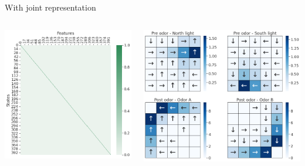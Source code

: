 \documentclass[bigger]{beamer}
\begin{document}
\begin{frame}[label={sec:org0d39be9}]{With joint representation}
\begin{columns}
\begin{column}{0.5\columnwidth}
\begin{center}
\includegraphics[height=0.4\textheight]{img/features-ego-joint-repr.png}
\end{center}
\end{column}
\begin{column}{0.5\columnwidth}
\begin{center}
\includegraphics[width=\textwidth]{img/policy-allo-joint-repr.png}

\end{center}
\end{column}
\end{columns}
\end{frame}
\end{document}
